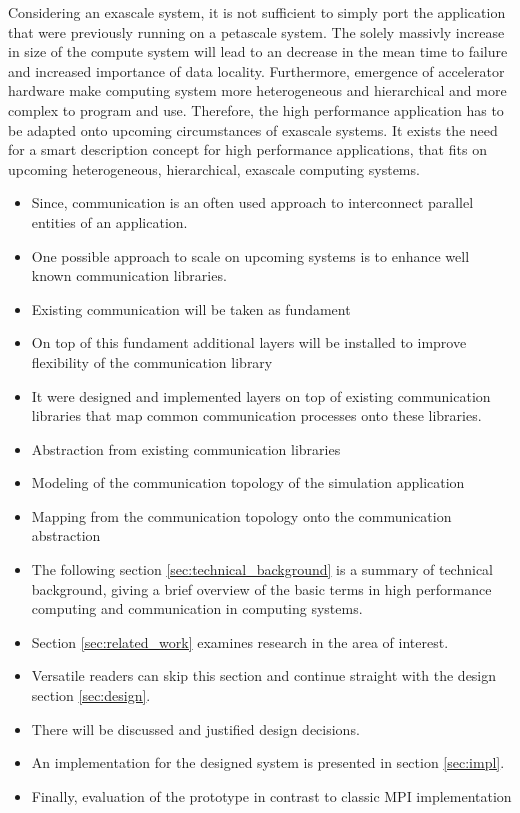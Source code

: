 Considering an exascale system, it is not sufficient to simply port
the application that were previously running on a petascale
system. The solely massivly increase in size of the compute system
will lead to an decrease in the mean time to failure and increased
importance of data locality.  Furthermore, emergence of accelerator
hardware make computing system more heterogeneous and hierarchical and
more complex to program and use. Therefore, the high performance
application has to be adapted onto upcoming circumstances of exascale
systems. It exists the need for a smart description concept for high
performance applications, that fits on upcoming heterogeneous,
hierarchical, exascale computing systems.

\begin{itemize}
\item Since, communication is an often used approach to interconnect
  parallel entities of an application.
\item One possible approach to scale on upcoming systems is to enhance
  well known communication libraries.
\item Existing communication will be taken as fundament
\item On top of this fundament additional layers will be installed to
  improve flexibility of the communication library
\end{itemize}

\begin{itemize}
\item It were designed and implemented layers on top of existing
  communication libraries that map common communication processes onto
  these libraries.

\item Abstraction from existing communication libraries
\item Modeling of the communication topology of the simulation
  application
\item Mapping from the communication topology onto the communication
  abstraction
\end{itemize}

\begin{itemize}
\item The following section \ref{sec:technical_background} is a
  summary of technical background, giving a brief overview of the
  basic terms in high performance computing and communication in
  computing systems.

\item Section \ref{sec:related_work} examines research in the area of
  interest.
\item Versatile readers can skip this section and continue straight
  with the design section \ref{sec:design}.
\item There will be discussed and justified design decisions.
\item An implementation for the designed system is presented in
  section \ref{sec:impl}.
\item Finally, evaluation of the prototype in contrast to classic MPI
  implementation


\end{itemize}


\cleardoublepage

